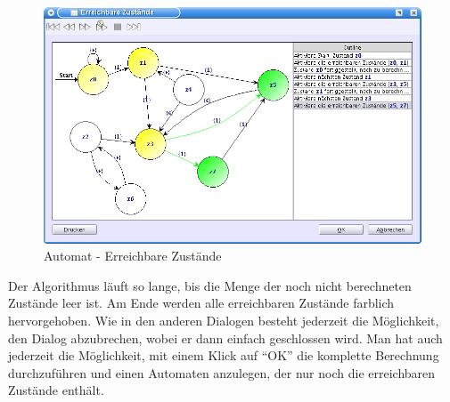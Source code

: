 \begin{figure}[h!]
\begin{center}
\includegraphics[width=12cm]{../images/reachable_states.png}
\caption{Automat - Erreichbare Zustände}
\end{center}
\end{figure}

Der Algorithmus läuft so lange, bis die Menge der noch nicht berechneten Zustände
leer ist. Am Ende werden alle erreichbaren Zustände farblich hervorgehoben. Wie
in den anderen Dialogen besteht jederzeit die Möglichkeit, den Dialog
abzubrechen, wobei er dann einfach geschlossen wird. Man hat auch jederzeit die
Möglichkeit, mit einem Klick auf "`OK"' die komplette Berechnung durchzuführen
und einen Automaten anzulegen, der nur noch die erreichbaren Zustände enthält.
